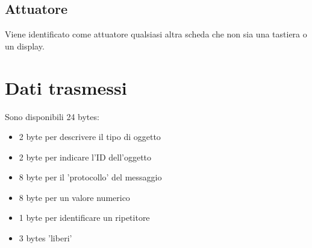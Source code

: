 \documentclass[italian]{article}
\begin{document}
    \subsection*{Attuatore}
    
    Viene identificato come attuatore qualsiasi altra scheda che non sia una tastiera o un display. 
    
    \section*{Dati trasmessi}
    
    Sono disponibili 24 bytes:
    
    \begin{itemize}
        \item 2 byte per descrivere il tipo di oggetto
        \item 2 byte per indicare l'ID dell'oggetto
        \item 8 byte per il 'protocollo' del messaggio
        \item 8 byte per un valore numerico
        \item 1 byte per identificare un ripetitore
        \item 3 bytes 'liberi' 
    \end{itemize}
    
\end{document}
